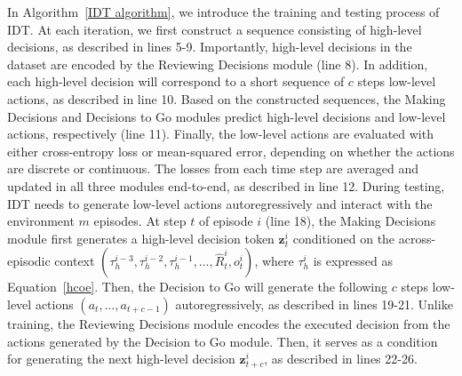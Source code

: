 \documentclass{article}
\theoremstyle{plain}
\theoremstyle{definition}
\theoremstyle{remark}
\begin{document}
In Algorithm~\ref{IDT algorithm}, we introduce the training and testing process of IDT. At each iteration, we first construct a sequence consisting of high-level decisions, as described in lines 5-9. Importantly, high-level decisions in the dataset are encoded by the Reviewing Decisions module (line 8). In addition, each high-level decision will correspond to a short sequence of $c$ steps low-level actions, as described in line 10. Based on the constructed sequences, the Making Decisions and Decisions to Go modules predict high-level decisions and low-level actions, respectively (line 11). Finally, the low-level actions are evaluated with either cross-entropy loss or mean-squared error, depending on whether the actions are discrete or continuous. The losses from each time step are averaged and updated in all three modules end-to-end, as described in line 12.
During testing, IDT needs to generate low-level actions autoregressively and interact with the environment $m$ episodes. At step $t$ of episode $i$ (line 18), the Making Decisions module first generates a high-level decision token $\textbf{z}_t^i$ conditioned on the across-episodic context $(\tau_h^{i-3},\tau_h^{i-2},\tau_h^{i-1},\dots,\hat{R}_t^i,o_t^i)$, where $\tau_h^{i}$ is expressed as Equation~\eqref{hcoe}. Then, the Decision to Go will generate the following $c$ steps low-level actions $(a_t,\dots,a_{t+c-1})$ autoregressively, as described in lines 19-21. Unlike training, the Reviewing Decisions module encodes the executed decision from the actions generated by the Decision to Go module. Then, it serves as a condition for generating the next high-level decision $\textbf{z}_{t+c}^i$, as described in lines 22-26.
\end{document}

